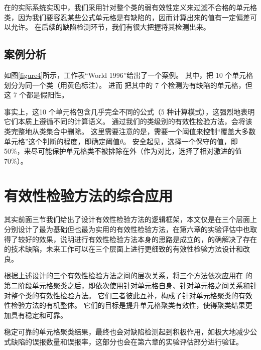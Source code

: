 在\wa 的实际系统实现中，我们采用针对整个类的弱有效性定义来过滤不合格的单元格类，因为我们要容忍某些公式单元格是有缺陷的，因而计算出来的值有一定偏差可以允许。
在后续的缺陷检测环节，我们有很大把握将其检测出来。

\subsection{案例分析}

如图\ref{figure4}所示，工作表“World 1996”给出了一个案例。
其中，\cu 把 10 个单元格划分为同一个类（用黄色标注）。
进而 \cu 把其中的 7 个检测为有缺陷的单元格，但这 7 个都是假阳性。

事实上，这10 个单元格包含几乎完全不同的公式（5 种计算模式），这强烈地表明它们本质上遵循不同的计算语义。
通过我们的类级别的有效性检验方法，\wa 会将该类完整地从类集合中删除。
这里需要注意的是，\wa 需要一个阈值来控制“覆盖大多数单元格”这个判断的程度，即确定阈值$\theta$。
安全起见，\wa 选择一个保守的值，即 50\%，来尽可能保护单元格类不被排除在外（作为对比，\ca 选择了相对激进的值70\%）。


\section{有效性检验方法的综合应用}
其实前面三节我们给出了设计有效性检验方法的逻辑框架，本文仅是在三个层面上分别设计了最为基础但也最为实用的有效性检验方法，在第六章的实验评估中也取得了较好的效果，说明进行有效性检验方法本身的思路是成立的，的确解决了\cu 存在的技术缺陷，未来工作可以在三个层面上进行更细致的有效性检验方法设计和改良。

根据上述设计的三个有效性检验方法之间的层次关系，\wa 将三个方法依次应用在 \cu 的第二阶段单元格聚类之后，即依次使用针对单元格自身、针对单元格之间关系和针对整个类的有效性检验方法。
它们三者彼此互补，构成了针对单元格聚类的有效性检验方法的有机整体。
它们的目标是提升单元格聚类有效性，使得聚类结果更加具有稳定和可靠。

稳定可靠的单元格聚类结果，最终也会对缺陷检测起到积极作用，如极大地减少公式缺陷的误报数量和误报率，这部分也会在第六章的实验评估部分进行验证。